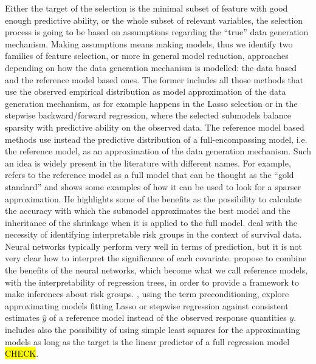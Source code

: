 \documentclass[american,]{article}
\theoremstyle{definition}
\begin{document}
Either the target of the selection is the minimal subset of feature with good enough predictive ability, or the whole subset of relevant variables, the selection process is going to be based on assumptions regarding the ``true'' data generation mechanism. Making assumptions means making models, thus we identify two families of feature selection, or more in general model reduction, approaches depending on how the data generation mechanism is modelled: the data based and the reference model based ones. The former includes all those methods that use the observed empirical distribution as model approximation of the data generation mechanism, as for example happens in the Lasso selection \cite{paper:tibshirani_lasso} or in the stepwise backward/forward regression, where the selected submodels balance sparsity with predictive ability on the observed data. The reference model based methods use instead the predictive distribution of a full-encompassing model, i.e. the reference model, as an approximation of the data generation mechanism. Such an idea is widely present in the literature with different names. For example, \cite{book:harrell} refers to the reference model as a full model that can be thought as the ``gold standard'' and shows some examples of how it can be used to look for a sparser approximation. He highlights some of the benefits as the possibility to calculate the accuracy with which the submodel approximates the best model and the inheritance of the shrinkage when it is applied to the full model. \cite{paper:faraggi_nn} deal with the necessity of identifying interpretable risk groups in the context of survival data. Neural networks typically perform very well in terms of prediction, but it is not very clear how to interpret the significance of each covariate. \cite{paper:faraggi_nn} propose to combine the benefits of the neural networks, which become what we call reference models, with the interpretability of regression trees, in order to provide a framework to make inferences about risk groups. \cite{paper:paul_preconditioning}, using the term preconditioning, explore approximating models fitting Lasso \citep{paper:tibshirani_lasso} or stepwise regression against consistent estimates $\hat{y}$ of a reference model instead of the observed response quantities $y$. \cite{book:harrell} includes also the possibility of using simple least squares for the approximating models as long as the target is the linear predictor of a full regression model \hl{CHECK}.
\\
\end{document}
